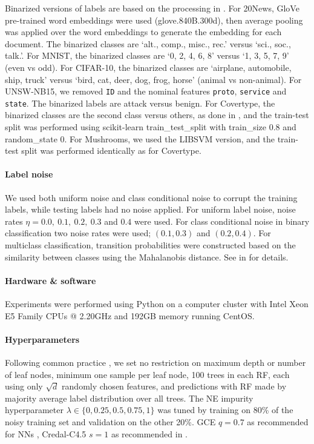 \documentclass[letterpaper]{article} %
\begin{document}
Binarized versions of labels are based on the processing in \cite{kiryo2017positive,wilton2022positive}.
For 20News, GloVe pre-trained word embeddings \cite{pennington2014glove} were used (glove.840B.300d),
then average pooling was applied over the word embeddings to generate the embedding for each document.
The binarized classes are ‘alt., comp., misc., rec.’ versus ‘sci., soc., talk.’.
For MNIST, the binarized classes are  ‘0, 2, 4, 6, 8’ versus ‘1, 3, 5, 7, 9’ (even vs odd).
For CIFAR-10, the binarized classes are ‘airplane, automobile, ship, truck’ versus ‘bird, cat, deer, dog, frog, horse’ (animal vs non-animal).
For UNSW-NB15, we removed \texttt{ID} and the nominal features \texttt{proto}, \texttt{service} and \texttt{state}.
The binarized labels are attack versus benign.
For Covertype, the binarized classes are the second class versus others, as done in \cite{collobert2001parallel}, and the train-test split was performed using
scikit-learn train\_test\_split with train\_size 0.8 and random\_state 0.
For Mushrooms, we used the LIBSVM \cite{chang2011libsvm} version, and the train-test split was performed identically as for Covertype.

\paragraph{Label noise}
We used both uniform noise and class conditional noise to corrupt the training labels, while testing labels had no noise applied.
For uniform label noise, noise rates $\eta=0.0,\ 0.1,\ 0.2,\ 0.3$ and $0.4$ were used.
For class conditional noise in binary classification two noise rates were used; $(0.1,0.3)$ and $(0.2,0.4)$.
For multiclass classification, transition probabilities were constructed based on the similarity between classes using the Mahalanobis distance.
See  in  for details.


\paragraph{Hardware \& software}
Experiments were performed using Python on a computer cluster with Intel Xeon E5 Family CPUs @ 2.20GHz and 192GB memory running CentOS.

\paragraph{Hyperparameters}
Following common practice \cite{pedregosa2011scikit},
we set no restriction on maximum depth or number of leaf nodes,
minimum one sample per leaf node,
100 trees in each RF,
each using only $\sqrt{d}$ randomly chosen features,
and
predictions with RF made by majority average label distribution over all trees.
The NE impurity hyperparameter $\lambda\in\{0,0.25,0.5,0.75,1\}$ was tuned by
training on 80\% of the noisy training set and validation on the other 20\%.
GCE $q=0.7$ as recommended for NNs \cite{zhang2018generalized},
Credal-C4.5 $s=1$ as recommended in \cite{mantas2014credal}.
\end{document}
